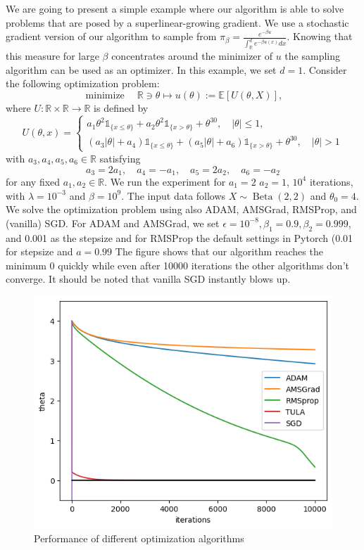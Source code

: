 \documentclass{article}
\begin{document}
We are going to present a simple example where our algorithm is able to solve problems that are posed by a superlinear-growing gradient.
We use a stochastic gradient version of our algorithm to sample from $\pi_\beta=\frac{e^{-\beta u}}{\int_\mathbb{R}^d e^{-\beta u(x)}dx}$.
Knowing that this measure for large $\beta$ concentrates around the minimizer of $u$ the sampling algorithm can be used as an optimizer.
In this example, we set $d=1$. Consider the following optimization problem:
$$
\operatorname{minimize} \quad \mathbb{R} \ni \theta \mapsto u(\theta):=\mathbb{E}[U(\theta, X)],
$$
where $U: \mathbb{R} \times \mathbb{R} \rightarrow \mathbb{R}$ is defined by
$$
U(\theta, x)=\left\{\begin{array}{l}
a_1 \theta^2 \mathds{1}_{\{x \leq \theta\}}+a_2 \theta^2 \mathds{1}_{\{x>\theta\}}+\theta^{30}, \quad|\theta| \leq 1, \\
\left(a_3|\theta|+a_4\right) \mathds{1}_{\{x \leq \theta\}}+\left(a_5|\theta|+a_6\right) \mathds{1}_{\{x>\theta\}}+\theta^{30}, \quad|\theta|>1
\end{array}\right.
$$
with $a_3, a_4, a_5, a_6 \in \mathbb{R}$ satisfying
$$
a_3=2 a_1, \quad a_4=-a_1, \quad a_5=2 a_2, \quad a_6=-a_2
$$
for any fixed $a_1, a_2 \in \mathbb{R}$.
We run the experiment for $a_1=2$ $a_2=1$, $10^4$ iterations, with $\lambda=10^{-3}$ and $\beta=10^9$.
The input data follows $X \sim \operatorname{Beta}(2,2)$ and $\theta_0=4$.
We solve the optimization problem using also ADAM, AMSGrad, RMSProp, and (vanilla) SGD. For ADAM and AMSGrad, we set $\epsilon=10^{-8}, \beta_1=0.9, \beta_2=0.999$, and 0.001 as the stepsize and for RMSProp the default settings in Pytorch (0.01 for stepsize and $a=0.99$
The figure shows that our algorithm reaches the minimum $0$ quickly while even after 10000 iterations the other algorithms don't converge.
It should be noted that vanilla SGD instantly blows up.

\begin{figure}[h!]
    \centering
    \includegraphics[width=0.5\linewidth]{image-wdTULA.png}
    \caption{Performance of different optimization algorithms}
    \label{fig:beta-opt}
\end{figure}
\end{document}
